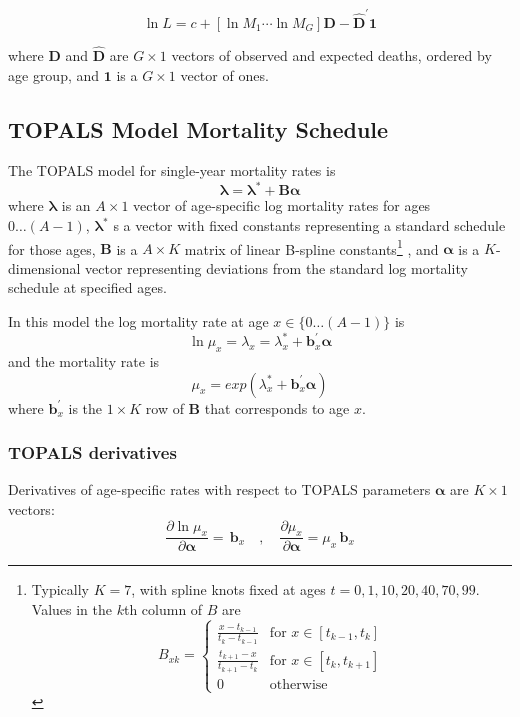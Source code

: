 \documentclass{article}
\begin{document}
\begin{equation}
\label{eq:vec-lik}
\ln L = 
c + \left[ \ln M_1 \cdots \ln M_G \right] \boldsymbol{D} -  \hat{\boldsymbol{D}}^\prime \boldsymbol{1} 
\end{equation}

\noindent where $\boldsymbol{D}$ and $\hat{\boldsymbol{D}}$ are $G\times 1$ vectors of observed and expected deaths, ordered by age group, and $\boldsymbol{1}$ is a $G\times1$ vector of ones.

\subsection{TOPALS Model Mortality Schedule}

The TOPALS model for single-year mortality rates is
$$
\boldsymbol{\lambda} = \boldsymbol{\lambda}^{\ast} + \boldsymbol{B} \boldsymbol{\alpha}
$$
where $\boldsymbol{\lambda}$ is an $A \times 1$ vector of age-specific log mortality rates for ages $0\ldots (A-1)$, $\boldsymbol{\lambda}^{\ast}$ s a vector with fixed constants representing a standard schedule for those ages, $\boldsymbol{B}$ is a $A \times K$ matrix of linear B-spline constants\footnote{Typically $K=7$, with spline knots fixed at ages $t=0,1,10,20,40,70,99$. Values in the $k$th column of $B$ are 
$$
  B_{xk} = 
\begin{cases}
\frac{x-t_{k-1}}{t_k-t_{k-1}}  &\mbox{for  }  x \in  [t_{k-1},t_k] \\
\frac{t_{k+1}-x}{t_{k+1}-t_k} &\mbox{for  }  x \in  [t_k,t_{k+1}] \\
0                              &\mbox{otherwise} 
\end{cases}
$$
}
, and $\boldsymbol{\alpha}$ is a $K$-dimensional vector representing deviations from the standard log mortality schedule at specified ages. 

In this model the log mortality rate at age $x \in \{0\ldots(A-1)\}$ is 
$$
\ln \mu_x = \lambda_x =  \lambda_x^{\ast} + \boldsymbol{b}_x^\prime \boldsymbol{\alpha}
$$
and the mortality rate is 
$$
\mu_x = exp \left( \lambda_x^{\ast} + \boldsymbol{b}_x^\prime \boldsymbol{\alpha} \right)
$$
where $\boldsymbol{b}_x^\prime$ is the $1 \times K$ row of $\boldsymbol{B}$ that corresponds to age $x$. 

\subsubsection{TOPALS derivatives}

Derivatives of age-specific rates with respect to TOPALS parameters $\boldsymbol{\alpha}$ are $K\times 1$ vectors: 
$$
\frac{\partial \ln \mu_x}{\partial \boldsymbol{\alpha}} = \,\boldsymbol{b}_x
\quad , \quad
\frac{\partial \mu_x}{\partial \boldsymbol{\alpha}} = \mu_x \,\boldsymbol{b}_x 
$$
\end{document}
